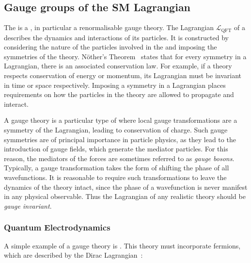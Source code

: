 \subsection{Gauge groups of the SM Lagrangian}
\label{sec:th:gauge}

The \SM is a \QFT, in particular a renormalisable gauge theory. 
The Lagrangian $\mathcal{L}_{\text{QFT}}$ of a \QFT describes the dynamics and interactions of its particles. %
It is constructed by considering the nature of the particles involved in the \QFT and imposing the symmetries of the theory.
N\"other's Theorem~\cite{Noether} states that for every symmetry in a Lagrangian, there is an associated conservation law. 
For example, if a theory respects conservation of energy or momentum, its Lagrangian must be invariant in time or space respectively. Imposing a symmetry in a Lagrangian places requirements on how the particles in the theory are allowed to propagate and interact. 

A gauge theory is a particular type of \QFT where local gauge transformations are a symmetry of the Lagrangian, leading to conservation of charge. Such gauge symmetries are of principal importance in particle physics, as they lead to the introduction of gauge fields, which generate the mediator particles. For this reason, the mediators of the forces are sometimes referred to as \emph{gauge bosons}. 
Typically, a gauge transformation takes the form of shifting the phase of all wavefunctions. It is reasonable to require such transformations to leave the dynamics of the theory intact, since the phase of a wavefunction is never manifest in any physical observable. Thus the Lagrangian of any realistic theory should be \emph{gauge invariant}.

\subsubsection{Quantum Electrodynamics}
\label{sec:th:qed}
A simple example of a gauge theory is \QED. 
This theory must incorporate fermions, which are described by the Dirac Lagrangian~\cite{griffiths2008introduction}:

